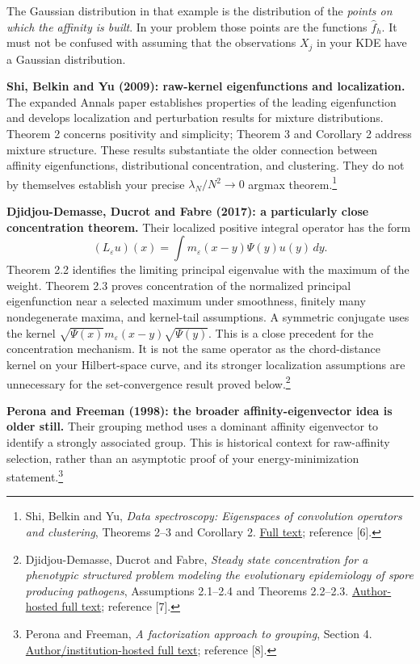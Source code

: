 \documentclass[10pt,a4paper]{article}
\newcommand{\fh}{\widehat f}
\newcommand{\eps}{\varepsilon}
\begin{document}
The Gaussian distribution in that example is the distribution of the \emph{points on which the affinity is built}. In your problem those points are the functions $\fh_h$. It must not be confused with assuming that the observations $X_j$ in your KDE have a Gaussian distribution.

\textbf{Shi, Belkin and Yu (2009): raw-kernel eigenfunctions and localization.} The expanded Annals paper establishes properties of the leading eigenfunction and develops localization and perturbation results for mixture distributions. Theorem 2 concerns positivity and simplicity; Theorem 3 and Corollary 2 address mixture structure. These results substantiate the older connection between affinity eigenfunctions, distributional concentration, and clustering. They do not by themselves establish your precise $\lambda_N/N^2\to0$ argmax theorem.\footnote{Shi, Belkin and Yu, \emph{Data spectroscopy: Eigenspaces of convolution operators and clustering}, Theorems 2--3 and Corollary 2. \href{https://arxiv.org/pdf/0807.3719}{Full text}; reference [6].}

\textbf{Djidjou-Demasse, Ducrot and Fabre (2017): a particularly close concentration theorem.} Their localized positive integral operator has the form
\[
 (L_\eps u)(x)=\int m_\eps(x-y)\Psi(y)u(y)\,dy.
\]
Theorem 2.2 identifies the limiting principal eigenvalue with the maximum of the weight. Theorem 2.3 proves concentration of the normalized principal eigenfunction near a selected maximum under smoothness, finitely many nondegenerate maxima, and kernel-tail assumptions. A symmetric conjugate uses the kernel $\sqrt{\Psi(x)}m_\eps(x-y)\sqrt{\Psi(y)}$. This is a close precedent for the concentration mechanism. It is not the same operator as the chord-distance kernel on your Hilbert-space curve, and its stronger localization assumptions are unnecessary for the set-convergence result proved below.\footnote{Djidjou-Demasse, Ducrot and Fabre, \emph{Steady state concentration for a phenotypic structured problem modeling the evolutionary epidemiology of spore producing pathogens}, Assumptions 2.1--2.4 and Theorems 2.2--2.3. \href{https://lmah.univ-lehavre.fr/~ducrot/pdf/DemasseDucrotFabre_M3AS.pdf}{Author-hosted full text}; reference [7].}

\textbf{Perona and Freeman (1998): the broader affinity-eigenvector idea is older still.} Their grouping method uses a dominant affinity eigenvector to identify a strongly associated group. This is historical context for raw-affinity selection, rather than an asymptotic proof of your energy-minimization statement.\footnote{Perona and Freeman, \emph{A factorization approach to grouping}, Section 4. \href{https://www.merl.com/publications/docs/TR99-03.pdf}{Author/institution-hosted full text}; reference [8].}
\end{document}
